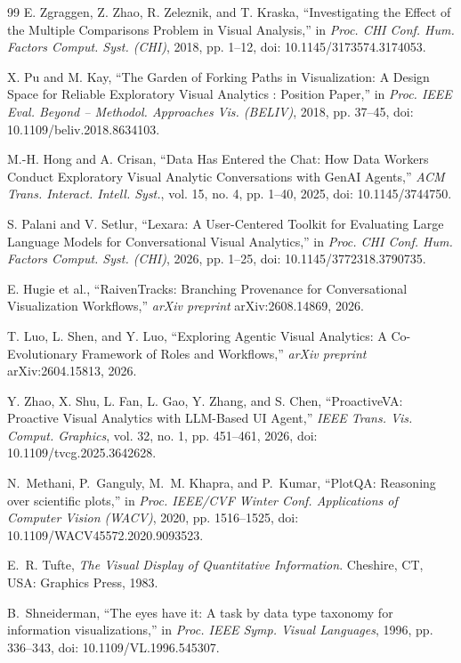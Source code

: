 \documentclass[conference]{IEEEtran}
\begin{document}
\begin{thebibliography}{99}
E. Zgraggen, Z. Zhao, R. Zeleznik, and T. Kraska, ``Investigating the Effect of the Multiple Comparisons Problem in Visual Analysis,'' in \emph{Proc. CHI Conf. Hum. Factors Comput. Syst. (CHI)}, 2018, pp. 1--12, doi: 10.1145/3173574.3174053.

X. Pu and M. Kay, ``The Garden of Forking Paths in Visualization: A Design Space for Reliable Exploratory Visual Analytics : Position Paper,'' in \emph{Proc. IEEE Eval. Beyond -- Methodol. Approaches Vis. (BELIV)}, 2018, pp. 37--45, doi: 10.1109/beliv.2018.8634103.

M.-H. Hong and A. Crisan, ``Data Has Entered the Chat: How Data Workers Conduct Exploratory Visual Analytic Conversations with GenAI Agents,'' \emph{ACM Trans. Interact. Intell. Syst.}, vol. 15, no. 4, pp. 1--40, 2025, doi: 10.1145/3744750.

S. Palani and V. Setlur, ``Lexara: A User-Centered Toolkit for Evaluating Large Language Models for Conversational Visual Analytics,'' in \emph{Proc. CHI Conf. Hum. Factors Comput. Syst. (CHI)}, 2026, pp. 1--25, doi: 10.1145/3772318.3790735.

E. Hugie et al., ``RaivenTracks: Branching Provenance for Conversational Visualization Workflows,'' \emph{arXiv preprint} arXiv:2608.14869, 2026.

T. Luo, L. Shen, and Y. Luo, ``Exploring Agentic Visual Analytics: A Co-Evolutionary Framework of Roles and Workflows,'' \emph{arXiv preprint} arXiv:2604.15813, 2026.

Y. Zhao, X. Shu, L. Fan, L. Gao, Y. Zhang, and S. Chen, ``ProactiveVA: Proactive Visual Analytics with LLM-Based UI Agent,'' \emph{IEEE Trans. Vis. Comput. Graphics}, vol. 32, no. 1, pp. 451--461, 2026, doi: 10.1109/tvcg.2025.3642628.

N.~Methani, P.~Ganguly, M.~M. Khapra, and P.~Kumar, ``PlotQA: Reasoning over scientific plots,'' in \emph{Proc. IEEE/CVF Winter Conf. Applications of Computer Vision (WACV)}, 2020, pp. 1516--1525, doi: 10.1109/WACV45572.2020.9093523.

E.~R. Tufte, \emph{The Visual Display of Quantitative Information}. Cheshire, CT, USA: Graphics Press, 1983.

B.~Shneiderman, ``The eyes have it: A task by data type taxonomy for information visualizations,'' in \emph{Proc. IEEE Symp. Visual Languages}, 1996, pp. 336--343, doi: 10.1109/VL.1996.545307.


\end{thebibliography}
\end{document}

